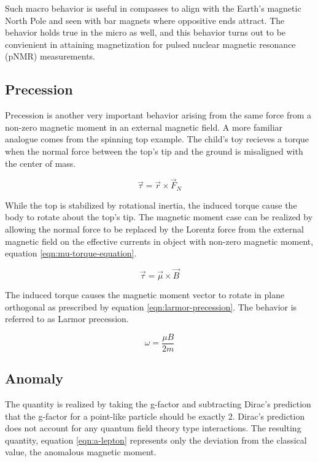 \noindent 
Such macro behavior is useful in compasses to align with the Earth's magnetic North Pole and seen with bar magnets where oppositive ends attract.  The behavior holds true in the micro as well, and this behavior turns out to be convienient in attaining magnetization for pulsed nuclear magnetic resonance (pNMR) measurements.

\subsection{Precession}
Precession is another very important behavior arising from the same force from a non-zero magnetic moment in an external magnetic field.  A more familiar analogue comes from the spinning top example.  The child's toy recieves a torque when the normal force between the top's tip and the ground is misaligned with the center of mass. 

\begin{equation}
\label{eqn:top-torque-equation}
\vec{\tau} = \vec{r} \times \vec{F}_{N}
\end{equation}

\noindent
While the top is stabilized by rotational inertia, the induced torque cause the body to rotate about the top's tip.  The magnetic moment case can be realized by allowing the normal force to be replaced by the Lorentz force from the external magnetic field on the effective currents in object with non-zero magnetic moment, equation \ref{eqn:mu-torque-equation}.

\begin{equation}
\label{eqn:mu-torque-equation}
\vec{\tau} = \vec{\mu} \times \vec{B}
\end{equation}

\noindent
The induced torque causes the magnetic moment vector to rotate in plane orthogonal as prescribed by equation \ref{eqn:larmor-precession}. The behavior is referred to as Larmor precession.

\begin{equation}
\label{eqn:larmor-precession}
\omega = \frac{\mu B}{2 m}
\end{equation}

\subsection{Anomaly}
The quantity \gmtwo is realized by taking the g-factor and subtracting Dirac's prediction that the g-factor for a point-like particle should be exactly 2.  Dirac's prediction does not account for any quantum field theory type interactions.  The resulting \gmtwo quantity, equation \ref{eqn:a-lepton} represents only the deviation from the classical value, the anomalous magnetic moment.

